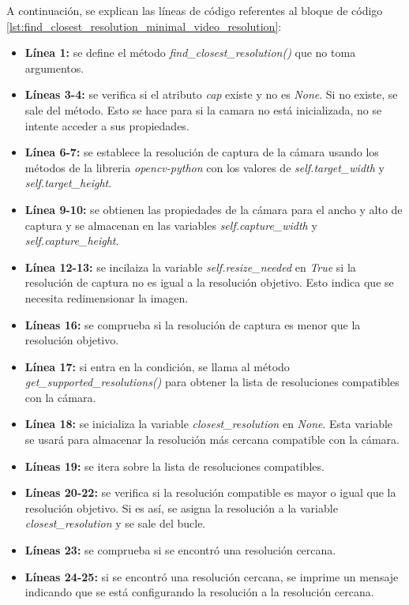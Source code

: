 A continuación, se explican las líneas de código referentes al bloque de código \ref{lst:find_closest_resolution_minimal_video_resolution}:
\begin{itemize}
    \item \textbf{Línea 1:} se define el método \textit{find\_closest\_resolution()} que no toma argumentos.
    \item \textbf{Líneas 3-4:} se verifica si el atributo \textit{cap} existe y no es \textit{None}. Si no existe, se sale del método. Esto se hace para si la camara no está inicializada, no se intente acceder a sus propiedades.
    \item \textbf{Línea 6-7:} se establece la resolución de captura de la cámara usando los métodos de la libreria \textit{opencv-python} con los valores de \textit{self.target\_width} y \textit{self.target\_height}.
    \item \textbf{Línea 9-10:} se obtienen las propiedades de la cámara para el ancho y alto de captura y se almacenan en las variables \textit{self.capture\_width} y \textit{self.capture\_height}.
    \item \textbf{Línea 12-13:} se incilaiza la variable \textit{self.resize\_needed} en \textit{True} si la resolución de captura no es igual a la resolución objetivo. Esto indica que se necesita redimensionar la imagen.
    \item \textbf{Líneas 16:} se comprueba si la resolución de captura es menor que la resolución objetivo. 
    \item \textbf{Línea 17:} si entra en la condición, se llama al método \textit{get\_supported\_resolutions()} para obtener la lista de resoluciones compatibles con la cámara.
    \item \textbf{Línea 18:} se inicializa la variable \textit{closest\_resolution} en \textit{None}. Esta variable se usará para almacenar la resolución más cercana compatible con la cámara.
    \item \textbf{Líneas 19:} se itera sobre la lista de resoluciones compatibles.
    \item \textbf{Líneas 20-22:} se verifica si la resolución compatible es mayor o igual que la resolución objetivo. Si es así, se asigna la resolución a la variable \textit{closest\_resolution} y se sale del bucle.
    \item \textbf{Líneas 23:} se comprueba si se encontró una resolución cercana.
    \item \textbf{Líneas 24-25:} si se encontró una resolución cercana, se imprime un mensaje indicando que se está configurando la resolución a la resolución cercana. 

\end{itemize}
